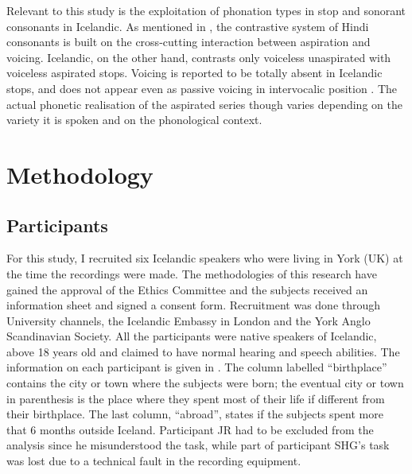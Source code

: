 \documentclass[11pt,a4paper,openany]{memoir}\usepackage[]{graphicx}\usepackage[]{color}
\begin{document}
Relevant to this study is the exploitation of phonation types in stop and sonorant consonants in Icelandic.
As mentioned in , the contrastive system of Hindi consonants is built on the cross-cutting interaction between aspiration and voicing.
Icelandic, on the other hand, contrasts only voiceless unaspirated with voiceless aspirated stops.
Voicing is reported to be totally absent in Icelandic stops, and does not appear even as passive voicing in intervocalic position \citep{arnason2011}.
The actual phonetic realisation of the aspirated series though varies depending on the variety it is spoken and on the phonological context.














\chapter{Methodology}

\section{Participants}
For this study, I recruited six Icelandic speakers who were living in York (UK) at the time the recordings were made.
The methodologies of this research have gained the approval of the Ethics Committee and the subjects received an information sheet and signed a consent form.
Recruitment was done through University channels, the Icelandic Embassy in London and the York Anglo Scandinavian Society.
All the participants were native speakers of Icelandic, above 18 years old and claimed to have normal hearing and speech abilities.
The information on each participant is given in .
The column labelled ``birthplace'' contains the city or town where the subjects were born; the eventual city or town in parenthesis is the place where they spent most of their life if different from their birthplace.
The last column, ``abroad'', states if the subjects spent more that 6 months outside Iceland.
Participant JR had to be excluded from the analysis since he misunderstood the task, while part of participant SHG's task was lost due to a technical fault in the recording equipment.


\end{document}
